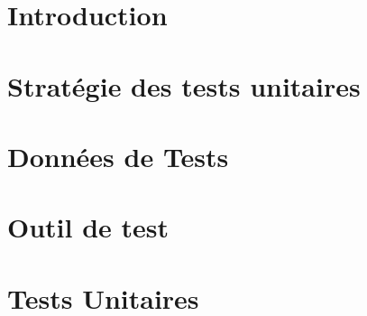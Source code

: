 \documentclass[asi,sansVersion]{picInsa}
\title{\PTU{}}
\author{\Michel} %
\begin{document}
\couverture{}

 \informationsGenerales{}


\tableofcontents

\setcounter{chapter}{0}

\chapter*{Introduction}
\label{introduction}


\chapter{Stratégie des tests unitaires}
\label{strategieDeTest}


\chapter{Données de Tests}
\label{donneesDeTests}


\chapter{Outil de test}
\label{outilDeTest}


\chapter{Tests Unitaires}
\label{testsUnitaires}


\pageQuatriemeCouverture
\end{document}
